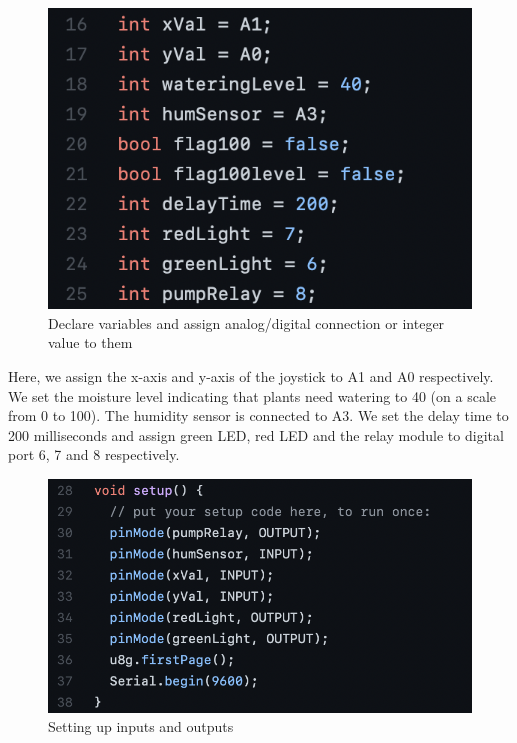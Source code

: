 \documentclass[12pt]{article}
\begin{document}
    \begin{figure}[H]
        \centering
        \includegraphics[width=14cm]{./images/assign.png}
        \caption{Declare variables and assign analog/digital connection or integer value to them}
        \label{fig:my_label}
    \end{figure}
    
    Here, we assign the x-axis and y-axis of the joystick to A1 and A0 respectively. We set the moisture level indicating that plants need watering to 40 (on a scale from 0 to 100). The humidity sensor is connected to A3. We set the delay time to 200 milliseconds and assign green LED, red LED and the relay module to digital port 6, 7 and 8 respectively.
    
    \begin{figure}[H]
        \centering
        \includegraphics[width=14cm]{./images/setup.png}
        \caption{Setting up inputs and outputs}
        \label{fig:steup}
    \end{figure}
    
\end{document}
